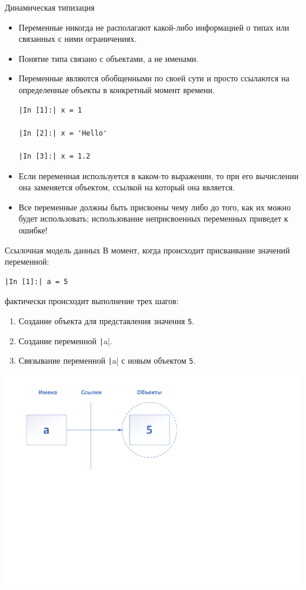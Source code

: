 \documentclass[aspectratio=169]{beamer}	%
\begin{document}
\begin{frame}[fragile]{Динамическая типизация}
\scriptsize
\begin{itemize}
	\item Переменные никогда не располагают какой-либо информацией о типах или связанных с ними ограничениях.
	\item Понятие типа связано с объектами, а не именами.
	\item Переменные являются обобщенными по своей сути и просто ссылаются на определенные объекты в конкретный момент времени.

\begin{verbatim}
|In [1]:| x = 1

|In [2]:| x = 'Hello'

|In [3]:| x = 1.2
\end{verbatim}
	\item Если переменная используется в каком-то выражении, то при его вычислении она заменяется объектом, ссылкой на который она является.
	\item Все переменные должны быть присвоены чему либо до того, как их можно будет использовать; использование неприсвоенных переменных приведет к ошибке!
\end{itemize}
\vfill
\end{frame}


\begin{frame}[fragile]{Ссылочная модель данных}
\scriptsize
В момент, когда происходит присваивание значений переменной:
\begin{verbatim}
|In [1]:| a = 5
\end{verbatim}
фактически происходит выполнение трех шагов:

\begin{enumerate}
	\item Создание объекта для представления значения \texttt{5}.
	\item Создание переменной \texttt|a|.
	\item Связывание переменной \texttt|a| с новым объектом \texttt{5}.
\end{enumerate}

\centering
\includegraphics[width=.6\textwidth]{./pics/имена_и_объекты}

\vfill
\end{frame}
\end{document}
